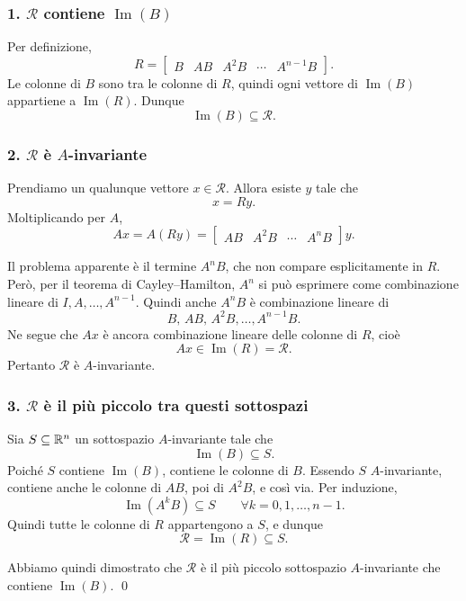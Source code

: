 \subsubsection*{1. \(\mathcal{R}\) contiene \(\operatorname{Im}(B)\)}

Per definizione,
\[
R=\begin{bmatrix}
B & AB & A^2B & \cdots & A^{n-1}B
\end{bmatrix}.
\]
Le colonne di \(B\) sono tra le colonne di \(R\), quindi ogni vettore di \(\operatorname{Im}(B)\) appartiene a \(\operatorname{Im}(R)\). Dunque
\[
\operatorname{Im}(B)\subseteq \mathcal{R}.
\]

\subsubsection*{2. \(\mathcal{R}\) è \(A\)-invariante}

Prendiamo un qualunque vettore \(x\in\mathcal{R}\).  
Allora esiste \(y\) tale che
\[
x=Ry.
\]
Moltiplicando per \(A\),
\[
Ax=A(Ry)=
\begin{bmatrix}
AB & A^2B & \cdots & A^nB
\end{bmatrix}y.
\]

Il problema apparente è il termine \(A^nB\), che non compare esplicitamente in \(R\).  
Però, per il teorema di Cayley--Hamilton, \(A^n\) si può esprimere come combinazione lineare di \(I,A,\dots,A^{n-1}\). Quindi anche \(A^nB\) è combinazione lineare di
\[
B,\,AB,\,A^2B,\dots,A^{n-1}B.
\]
Ne segue che \(Ax\) è ancora combinazione lineare delle colonne di \(R\), cioè
\[
Ax\in\operatorname{Im}(R)=\mathcal{R}.
\]
Pertanto \(\mathcal{R}\) è \(A\)-invariante.

\subsubsection*{3. \(\mathcal{R}\) è il più piccolo tra questi sottospazi}

Sia \(S\subseteq\mathbb{R}^n\) un sottospazio \(A\)-invariante tale che
\[
\operatorname{Im}(B)\subseteq S.
\]
Poiché \(S\) contiene \(\operatorname{Im}(B)\), contiene le colonne di \(B\).  
Essendo \(S\) \(A\)-invariante, contiene anche le colonne di \(AB\), poi di \(A^2B\), e così via. Per induzione,
\[
\operatorname{Im}(A^kB)\subseteq S
\qquad \forall k=0,1,\dots,n-1.
\]
Quindi tutte le colonne di \(R\) appartengono a \(S\), e dunque
\[
\mathcal{R}=\operatorname{Im}(R)\subseteq S.
\]

Abbiamo quindi dimostrato che \(\mathcal{R}\) è il più piccolo sottospazio \(A\)-invariante che contiene \(\operatorname{Im}(B)\).
\qed


